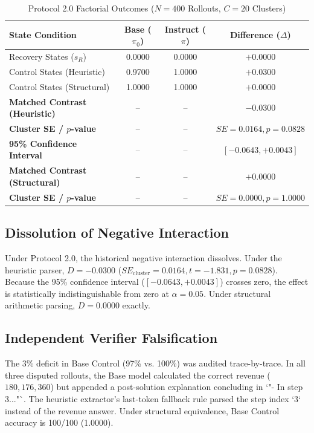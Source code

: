 \documentclass[10pt,conference]{IEEEtran}
\begin{document}
\begin{table}[htbp]
\caption{Protocol 2.0 Factorial Outcomes ($N=400$ Rollouts, $C=20$ Clusters)}
\label{tab:outcomes}
\centering
\begin{tabular}{lccc}
\toprule
\textbf{State Condition} & \textbf{Base ($\pi_0$)} & \textbf{Instruct ($\pi$)} & \textbf{Difference ($\Delta$)} \\
\midrule
Recovery States ($s_R$) & 0.0000 & 0.0000 & $+0.0000$ \\
Control States (Heuristic) & 0.9700 & 1.0000 & $+0.0300$ \\
Control States (Structural) & 1.0000 & 1.0000 & $+0.0000$ \\
\midrule
\textbf{Matched Contrast (Heuristic)} & -- & -- & \textbf{$-0.0300$} \\
\textbf{Cluster SE / $p$-value} & -- & -- & $SE = 0.0164, p = 0.0828$ \\
\textbf{95\% Confidence Interval} & -- & -- & $[-0.0643, +0.0043]$ \\
\midrule
\textbf{Matched Contrast (Structural)} & -- & -- & \textbf{$+0.0000$} \\
\textbf{Cluster SE / $p$-value} & -- & -- & $SE = 0.0000, p = 1.0000$ \\
\bottomrule
\end{tabular}
\end{table}

\subsection{Dissolution of Negative Interaction}
Under Protocol 2.0, the historical negative interaction dissolves. Under the heuristic parser, $D = -0.0300$ ($SE_{\text{cluster}} = 0.0164, t = -1.831, p = 0.0828$). Because the 95\% confidence interval ($[-0.0643, +0.0043]$) crosses zero, the effect is statistically indistinguishable from zero at $\alpha = 0.05$. Under structural arithmetic parsing, $D = 0.0000$ exactly.

\subsection{Independent Verifier Falsification}
The 3\% deficit in Base Control (97\% vs. 100\%) was audited trace-by-trace. In all three disputed rollouts, the Base model calculated the correct revenue ($180, 176, 360$) but appended a post-solution explanation concluding in `"- In step 3..."`. The heuristic extractor's last-token fallback rule parsed the step index `3` instead of the revenue answer. Under structural equivalence, Base Control accuracy is 100/100 (1.0000).
\end{document}
